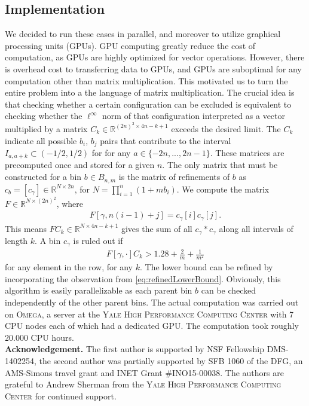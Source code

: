 \documentclass[10pt]{amsart}
\begin{document}
\subsection{Implementation}
We decided to run these cases in parallel, and moreover to utilize graphical processing units (GPUs).  GPU computing greatly reduce the cost of computation, as GPUs are highly optimized for vector operations.  However, there is overhead cost to transferring data to GPUs, and GPUs are suboptimal for any computation other than matrix multiplication. This motivated us to turn the entire problem into a the language
of matrix multiplication.  The crucial idea is that checking whether a certain configuration can be excluded is equivalent to checking whether the $\ell^{\infty}$ norm of that configuration interpreted as a vector multiplied by a matrix $C_k\in\mathbb{R}^{(2n)^2\times 4n-k+1}$ exceeds the desired limit.    The $C_k$ indicate all possible $b_i$, $b_j$ pairs that contribute to the interval $I_{a,a+k}\subset (-1/2,1/2)$ for for any $a\in\{-2n,..., 2n-1\}$.  These matrices are precomputed once and stored for a given $n$. 
The only matrix that must be constructed for a bin $b\in B_{n,m}$ is the matrix of refinements of $b$ as $c_b = [c_\gamma]\in \mathbb{R}^{N\times 2n}$, for $N = \prod_{i=1}^n \left( 1 + m b_i \right)$.  We compute the matrix $F\in \mathbb{R}^{N\times (2n)^2}$, where
\begin{eqnarray*}
F[\gamma,n(i-1) + j] = c_\gamma[i]  c_\gamma[j].
\end{eqnarray*}
This means $F C_k \in \mathbb{R}^{N\times 4n-k+1}$ gives the sum of all $c_\gamma*c_\gamma$ along all intervals of length $k$.  A bin $c_\gamma$ is ruled out if 
\begin{eqnarray*}
F[\gamma,\cdot] C_k > 1.28 + \frac{2}{m} + \frac{1}{m^2} 
\end{eqnarray*} 
for any element in the row, for any $k$.  The lower bound can be refined by incorporating the observation from \eqref{eq:refinedLowerBound}.
Obviously, this algorithm is easily parallelizable as each parent bin $b$ can be checked independently of the other parent bins. The actual computation was carried out on \textsc{Omega}, a server at the \textsc{Yale High Performance Computing Center} with 7 CPU nodes each of which had a dedicated GPU. 
The computation took roughly 20.000 CPU hours. \\



\textbf{Acknowledgement.} The first author is supported by NSF Fellowship DMS-1402254, the second author was partially supported by SFB 1060 of the DFG, an AMS-Simons
travel grant and INET Grant \#INO15-00038. The authors are grateful to Andrew Sherman from the \textsc{Yale High Performance Computing Center} for continued support.
\end{document}
